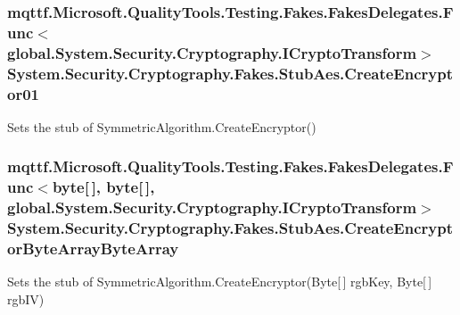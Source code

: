 \hypertarget{class_system_1_1_security_1_1_cryptography_1_1_fakes_1_1_stub_aes_a4667690428549220229ef2ff3c0b1ec7}{
\subsubsection[{Create\-Encryptor01}]{\setlength{\rightskip}{0pt plus 5cm}mqttf.\-Microsoft.\-Quality\-Tools.\-Testing.\-Fakes.\-Fakes\-Delegates.\-Func$<$global.\-System.\-Security.\-Cryptography.\-I\-Crypto\-Transform$>$ System.\-Security.\-Cryptography.\-Fakes.\-Stub\-Aes.\-Create\-Encryptor01}}\label{class_system_1_1_security_1_1_cryptography_1_1_fakes_1_1_stub_aes_a4667690428549220229ef2ff3c0b1ec7}


Sets the stub of Symmetric\-Algorithm.\-Create\-Encryptor()

\hypertarget{class_system_1_1_security_1_1_cryptography_1_1_fakes_1_1_stub_aes_a4a14af686b0ca0e211382d337e2448f5}{
\subsubsection[{Create\-Encryptor\-Byte\-Array\-Byte\-Array}]{\setlength{\rightskip}{0pt plus 5cm}mqttf.\-Microsoft.\-Quality\-Tools.\-Testing.\-Fakes.\-Fakes\-Delegates.\-Func$<$byte\mbox{[}$\,$\mbox{]}, byte\mbox{[}$\,$\mbox{]}, global.\-System.\-Security.\-Cryptography.\-I\-Crypto\-Transform$>$ System.\-Security.\-Cryptography.\-Fakes.\-Stub\-Aes.\-Create\-Encryptor\-Byte\-Array\-Byte\-Array}}\label{class_system_1_1_security_1_1_cryptography_1_1_fakes_1_1_stub_aes_a4a14af686b0ca0e211382d337e2448f5}


Sets the stub of Symmetric\-Algorithm.\-Create\-Encryptor(\-Byte\mbox{[}$\,$\mbox{]} rgb\-Key, Byte\mbox{[}$\,$\mbox{]} rgb\-I\-V)

